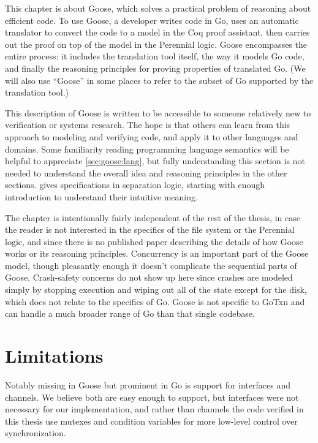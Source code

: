 This chapter is about Goose, which solves a practical
problem of reasoning about efficient code. To use Goose, a developer writes
code in Go, uses an automatic translator to convert the code to a model in the Coq proof
assistant, then carries out the proof on top of the model in the Perennial logic. Goose encompasses
the entire process: it includes the translation tool itself, the way it models Go
code, and finally the reasoning principles for proving properties of translated
Go. (We will also use ``Goose'' in some places to refer to the subset of Go
supported by the translation tool.)

This description of Goose is written to be accessible to someone relatively new
to verification or systems research. The hope is that others can learn from this
approach to modeling and verifying code, and apply it to other languages and
domains. Some familiarity reading programming language semantics will be helpful
to appreciate \cref{sec:goose:lang}, but fully understanding this section is not
needed to understand the overall idea and reasoning principles in the other
sections.  gives specifications in separation logic,
starting with enough introduction to understand their intuitive meaning.

The chapter is intentionally fairly independent of the rest of the thesis, in
case the reader is not interested in the specifics of the file system or the
Perennial logic, and since there is no published paper describing the details of
how Goose works or its reasoning principles. Concurrency is an important part of
the Goose model, though pleasantly enough it doesn't complicate the sequential
parts of Goose. Crash-safety concerns do not show up here since crashes are
modeled simply by stopping execution and wiping out all of the state except for
the disk, which does not relate to the specifics of Go. Goose is not specific to
GoTxn and can handle a much broader range of Go than that single codebase.








\section{Limitations}%
\label{sec:goose:limitations}

Notably missing in Goose but prominent in Go is support for interfaces
and channels. We believe both are easy enough to support, but interfaces
were not necessary for our implementation, and rather than channels the code
verified in this thesis
use mutexes and condition variables for more low-level control over
synchronization.

